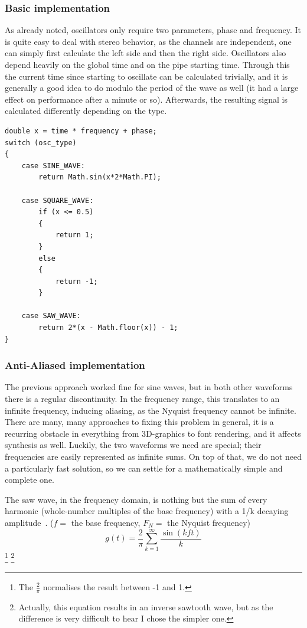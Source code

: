 \documentclass[11pt,a4paper]{article}
\begin{document}
\subsubsection{Basic implementation}

As already noted, oscillators only require two parameters, phase and frequency. It is quite easy to deal with stereo behavior, as the channels are independent, one can simply first calculate the left side and then the right side. Oscillators also depend heavily on the global time and on the pipe starting time. Through this the current time since starting to oscillate can be calculated trivially, and it is generally a good idea to do modulo the period of the wave as well (it had a large effect on performance after a minute or so). Afterwards, the resulting signal is calculated differently depending on the type.
\\\begin{minipage}{\linewidth}
\begin{lstlisting}
double x = time * frequency + phase;
switch (osc_type)
{
	case SINE_WAVE:
		return Math.sin(x*2*Math.PI);

	case SQUARE_WAVE:
		if (x <= 0.5)
		{
		    return 1;
		}
		else
		{
		    return -1;
		}

	case SAW_WAVE:
		return 2*(x - Math.floor(x)) - 1;
}
\end{lstlisting}
\end{minipage}

\subsubsection{Anti-Aliased implementation}

The previous approach worked fine for sine waves, but in both other waveforms there is a regular discontinuity. In the frequency range, this translates to an infinite frequency, inducing aliasing, as the Nyquist frequency cannot be infinite.
There are many, many approaches to fixing this problem in general, it is a recurring obstacle in everything from 3D-graphics to font rendering, and it affects synthesis as well. Luckily, the two waveforms we need are special; their frequencies are easily represented as infinite sums. On top of that, we do not need a particularly fast solution, so we can settle for a mathematically simple and complete one.

The saw wave, in the frequency domain, is nothing but the sum of every harmonic (whole-number multiples of the base frequency) with a 1/k decaying amplitude~\cite{WolframSaw}.
(\(f = \) the base frequency, \(F_N = \) the Nyquist frequency)
\begin{equation}
g(t) = \frac{2}{\pi}\sum\limits_{k=1}^\infty{\frac{\sin(kft)}{k}}
\end{equation}
\footnote{The \(\frac{2}{\pi}\) normalises the result between -1 and 1.}
\footnote{Actually, this equation results in an inverse sawtooth wave, but as the difference is very difficult to hear I chose the simpler one.}
\end{document}
